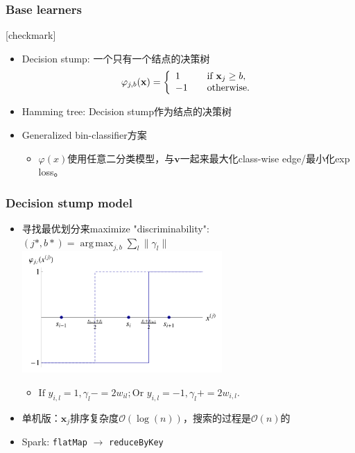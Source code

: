 \documentclass{beamer}
\DeclareMathOperator*{\argmax}{arg\,max}
\begin{document}
\begin{frame}
\frametitle{Base learners}
{
  [checkmark]
  \begin{itemize}
    \item Decision stump: 一个只有一个结点的决策树
       $$ \varphi_{j,b}(\mathbf{x}) = \left\{
            \begin{array}{l l}
              1 & \quad \text{if } \mathbf{x}_j \geq b, \\
             -1 & \quad \text{otherwise.}
            \end{array} \right.$$
    \item Hamming tree: Decision stump作为结点的决策树
    \item Generalized bin-classifier方案
      \begin{itemize}
        \item $\varphi(x)$使用任意二分类模型，与$\mathbf{v}$一起来最大化class-wise edge/最小化exp loss。
      \end{itemize}
  \end{itemize}
}
\end{frame}

\begin{frame}
\frametitle{Decision stump model}
  \begin{itemize}
    \item 寻找最优划分来maximize "discriminability": $(j*,b*) = \argmax_{j,b} \sum_{l}\| \gamma_l \|$
    \includegraphics[width=0.6\textwidth]{img/ds_split.png}
    \begin{itemize}
      \item $\text{If } y_{i,l}=1, \gamma_l -= 2w_{il}; \text{Or } y_{i,l}=-1, \gamma_l += 2w_{i,l}.$
    \end{itemize}
    \item 单机版：$\mathbf{x}_j$排序复杂度$\mathcal{O}(\log(n))$，搜索的过程是$\mathcal{O}(n)$的
    \item Spark: {\color{blue} \texttt{flatMap} $\rightarrow$ \texttt{reduceByKey}}
  \end{itemize}
\end{frame}
\end{document}
